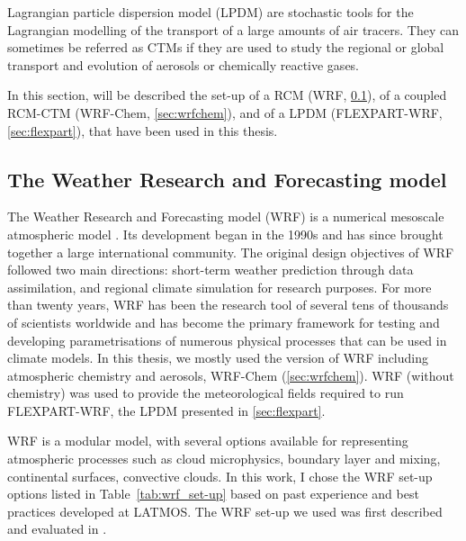 Lagrangian particle dispersion model (LPDM) are stochastic tools for the Lagrangian modelling of the transport of a large amounts of air tracers. They can sometimes be referred as CTMs if they are used to study the regional or global transport and evolution of aerosols or chemically reactive gases. %

In this section, will be described the set-up of a RCM (WRF, \cref{sec:wrf}), of a coupled RCM-CTM (WRF-Chem, \cref{sec:wrfchem}), and of a LPDM (FLEXPART-WRF, \cref{sec:flexpart}), that have been used in this thesis.

    \subsection{The Weather Research and Forecasting model}
    \label{sec:wrf}
    The Weather Research and Forecasting model (WRF) is a numerical mesoscale atmospheric model \citep{skamarock_description_2022}. Its development began in the 1990s and has since brought together a large international community. The original design objectives of WRF followed two main directions: short-term weather prediction through data assimilation, and regional climate simulation for research purposes. For more than twenty years, WRF has been the research tool of several tens of thousands of scientists worldwide and has become the primary framework for testing and developing parametrisations of numerous physical processes that can be used in climate models. %
    In this thesis, we mostly used the version of WRF including atmospheric chemistry and aerosols, WRF-Chem (\cref{sec:wrfchem}). WRF (without chemistry) was used to provide the meteorological fields required to run FLEXPART-WRF, the LPDM presented in \cref{sec:flexpart}. 

    WRF is a modular model, with several options available for representing atmospheric processes such as cloud microphysics, boundary layer and mixing, continental surfaces, convective clouds. In this work, I chose the WRF set-up options listed in Table~\ref{tab:wrf_set-up} based on past experience and best practices developed at LATMOS. The WRF set-up we used was first described and evaluated in \citet{marelle_implementation_2021}. 

